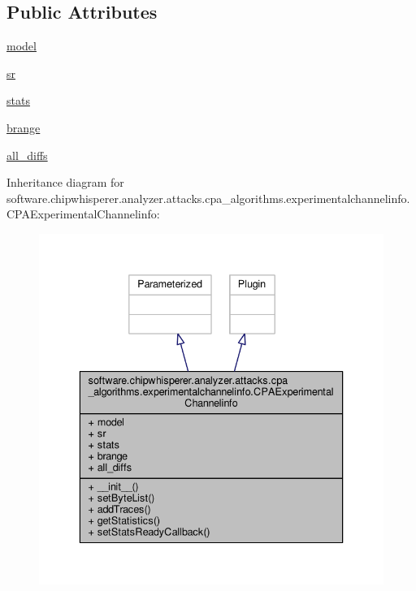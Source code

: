 \subsection*{Public Attributes}
\begin{DoxyCompactItemize}
\item 
\hyperlink{classsoftware_1_1chipwhisperer_1_1analyzer_1_1attacks_1_1cpa__algorithms_1_1experimentalchannelif6c161da2587ecb2ba5aefd93c43622a_a3e8e62080cfc027bfeaf640c3197024e}{model}
\item 
\hyperlink{classsoftware_1_1chipwhisperer_1_1analyzer_1_1attacks_1_1cpa__algorithms_1_1experimentalchannelif6c161da2587ecb2ba5aefd93c43622a_a9ce3bc1dc637d259b0435741691d7bff}{sr}
\item 
\hyperlink{classsoftware_1_1chipwhisperer_1_1analyzer_1_1attacks_1_1cpa__algorithms_1_1experimentalchannelif6c161da2587ecb2ba5aefd93c43622a_a3da347b24ca3287224d4f3e023e100ac}{stats}
\item 
\hyperlink{classsoftware_1_1chipwhisperer_1_1analyzer_1_1attacks_1_1cpa__algorithms_1_1experimentalchannelif6c161da2587ecb2ba5aefd93c43622a_a6ef4a4594c498869ef09bd4163a64d48}{brange}
\item 
\hyperlink{classsoftware_1_1chipwhisperer_1_1analyzer_1_1attacks_1_1cpa__algorithms_1_1experimentalchannelif6c161da2587ecb2ba5aefd93c43622a_a2547fed7ec4fd8ec24d7e6c4cee83706}{all\+\_\+diffs}
\end{DoxyCompactItemize}


Inheritance diagram for software.\+chipwhisperer.\+analyzer.\+attacks.\+cpa\+\_\+algorithms.\+experimentalchannelinfo.\+C\+P\+A\+Experimental\+Channelinfo\+:\nopagebreak
\begin{figure}[H]
\begin{center}
\leavevmode
\includegraphics[width=336pt]{dd/def/classsoftware_1_1chipwhisperer_1_1analyzer_1_1attacks_1_1cpa__algorithms_1_1experimentalchanneli0447cd45f4b1158d6d12dda39d410c16}
\end{center}
\end{figure}


